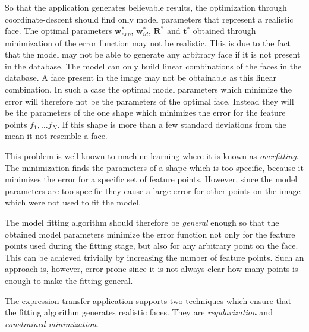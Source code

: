 \documentclass[11pt,a4paper,twoside]{report}
\begin{document}
So that the application generates believable results, the optimization through coordinate-descent
should find only model parameters that represent a realistic face. The optimal
parameters $\mathbf{w}^*_{exp}$, $\mathbf{w}^*_{id}$, $\mathbf{R}^*$ and
$\mathbf{t}^*$ obtained through minimization of the error function may not be realistic. This is due to the fact that the model may not
be able to generate any arbitrary face if it is not present in the database. The model
can only build linear combinations of the faces in the database. A face present
in the image may not be obtainable as this linear combination. In such a case the
optimal model parameters which minimize the error will therefore not be the parameters
of the optimal face. Instead they will be the parameters of the one shape which
minimizes the error for the feature points $f_1, \ldots f_N$. If this shape is
more than a few standard deviations from the mean it not resemble a face. 

This problem is well known to machine learning
where it is known as \textit{overfitting}. The minimization finds the parameters
of a shape which is too specific, because it minimizes the error for a specific set of
feature points. However, since the model parameters are too specific they cause
a large error for other points on the image which were not used to fit the
model. 

The model fitting algorithm should therefore be \textit{general} enough so that
the obtained model parameters minimize the error function not only for the feature points used during the fitting stage, but also for any
arbitrary point on the face. This can be achieved trivially by increasing the
number of feature points. Such an approach is, however, error prone since it is not
always clear how many points is enough to make the fitting general. 

The expression transfer application supports two techniques which ensure that the
fitting algorithm generates realistic faces. They are \textit{regularization}
and \textit{constrained minimization}.
\end{document}
